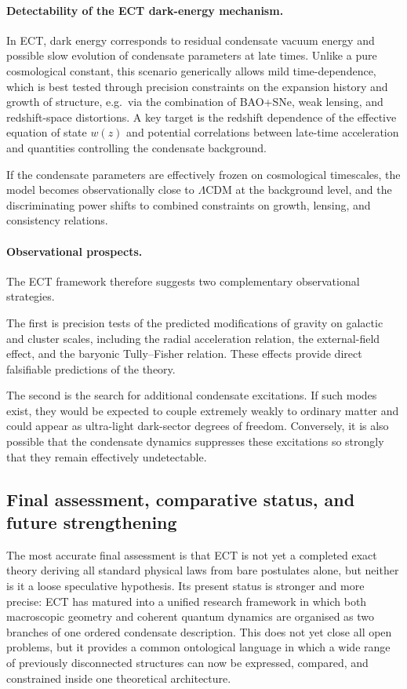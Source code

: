 \documentclass[11pt,a4paper]{article}
\numberwithin{equation}{section}
\begin{document}
\paragraph{Detectability of the ECT dark-energy mechanism.}

In ECT, dark energy corresponds to residual condensate vacuum energy and
possible slow evolution of condensate parameters at late times. Unlike a
pure cosmological constant, this scenario generically allows mild
time-dependence, which is best tested through precision constraints on
the expansion history and growth of structure, e.g.\ via the
combination of BAO+SNe, weak lensing, and redshift-space distortions.
A key target is the redshift dependence of the effective equation of
state $w(z)$ and potential correlations between late-time acceleration
and quantities controlling the condensate background.

If the condensate parameters are effectively frozen on cosmological
timescales, the model becomes observationally close to $\Lambda$CDM at
the background level, and the discriminating power shifts to combined
constraints on growth, lensing, and consistency relations.


\paragraph{Observational prospects.}

The ECT framework therefore suggests two complementary observational
strategies.

The first is precision tests of the predicted modifications of gravity
on galactic and cluster scales, including the radial acceleration
relation, the external-field effect, and the baryonic Tully--Fisher
relation. These effects provide direct falsifiable predictions of the
theory.

The second is the search for additional condensate excitations. If such
modes exist, they would be expected to couple extremely weakly to
ordinary matter and could appear as ultra-light dark-sector degrees of
freedom. Conversely, it is also possible that the condensate dynamics
suppresses these excitations so strongly that they remain effectively
undetectable.


\subsection*{Final assessment, comparative status, and future strengthening}

The most accurate final assessment is that ECT is not yet a completed
exact theory deriving all standard physical laws from bare postulates
alone, but neither is it a loose speculative hypothesis.
Its present status is stronger and more precise:
ECT has matured into a unified research framework in which both
macroscopic geometry and coherent quantum dynamics are organised as two
branches of one ordered condensate description.
This does not yet close all open problems, but it provides a common
ontological language in which a wide range of previously disconnected
structures can now be expressed, compared, and constrained inside one
theoretical architecture.
\end{document}
